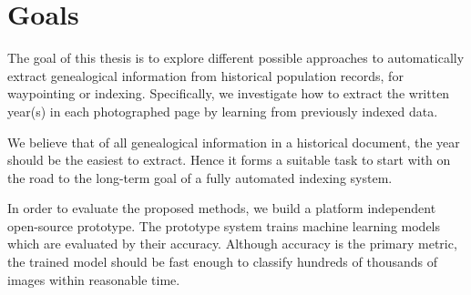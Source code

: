 \section{Goals}

The goal of this thesis is to explore different possible approaches to automatically extract genealogical information from historical population records, for waypointing or indexing. Specifically, we investigate how to extract the written year(s) in each photographed page by learning from previously indexed data.

We believe that of all genealogical information in a historical document, the year should be the easiest to extract. Hence it forms a suitable task to start with on the road to the long-term goal of a fully automated indexing system.


In order to evaluate the proposed methods, we build a platform independent open-source prototype. The prototype system trains machine learning models which are evaluated by their accuracy.
Although accuracy is the primary metric, the trained model should be fast enough to classify hundreds of thousands of images within reasonable time.



